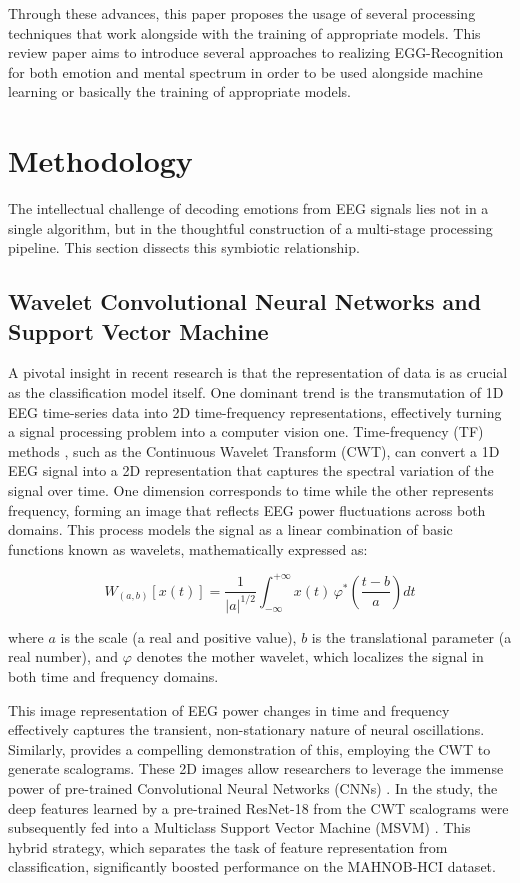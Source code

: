 \documentclass[conference]{IEEEtran}
\begin{document}
 Through these advances, this paper proposes the usage of several processing techniques that work alongside with the training of appropriate models. This review paper aims to introduce several approaches to realizing EGG-Recognition for both emotion and mental spectrum in order to be used alongside machine learning or basically the training of appropriate models.
\section{Methodology}
The intellectual challenge of decoding emotions from EEG signals lies not in a single algorithm, but in the thoughtful construction of a multi-stage processing pipeline. This section dissects this symbiotic relationship.

\subsection{Wavelet Convolutional Neural Networks and Support Vector Machine}
A pivotal insight in recent research is that the representation of data is as crucial as the classification model itself. One dominant trend is the transmutation of 1D EEG time-series data into 2D time-frequency representations, effectively turning a signal processing problem into a computer vision one. Time-frequency (TF) methods \cite{Pachori2023TimeFrequencyBook}, such as the Continuous Wavelet Transform (CWT), can convert a 1D EEG signal into a 2D representation that captures the spectral variation of the signal over time. One dimension corresponds to time while the other represents frequency, forming an image that reflects EEG power fluctuations across both domains. This process models the signal as a linear combination of basic functions known as wavelets, mathematically expressed as:

\begin{equation}
W_{(a,b)}[x(t)] = \frac{1}{|a|^{1/2}} \int_{-\infty}^{+\infty} x(t)\,\varphi^{*}\!\left(\frac{t - b}{a}\right) dt
\end{equation}

where \(a\) is the scale (a real and positive value), \(b\) is the translational parameter (a real number), and \(\varphi\) denotes the mother wavelet, which localizes the signal in both time and frequency domains.

This image representation of EEG power changes in time and frequency effectively captures the transient, non-stationary nature of neural oscillations. Similarly, \cite{Bagherzadeh2023HybridEEGWaveletCNN_SVM} provides a compelling demonstration of this, employing the CWT to generate scalograms. These 2D images allow researchers to leverage the immense power of pre-trained Convolutional Neural Networks (CNNs) \cite{Bagherzadeh2023HybridEEGWaveletCNN_SVM}. In the study, the deep features learned by a pre-trained ResNet-18 from the CWT scalograms were subsequently fed into a Multiclass Support Vector Machine (MSVM) \cite{Bagherzadeh2023HybridEEGWaveletCNN_SVM}. This hybrid strategy, which separates the task of feature representation from classification, significantly boosted performance on the MAHNOB-HCI dataset.
\end{document}
